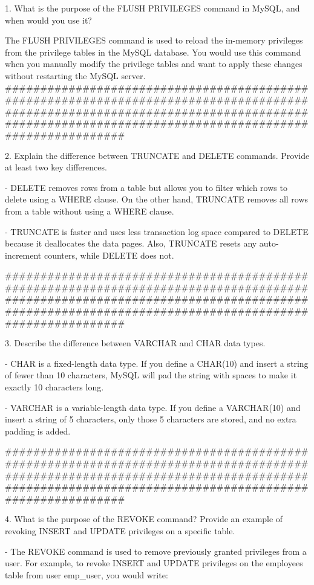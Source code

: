 
1. What is the purpose of the FLUSH PRIVILEGES command in MySQL, and when would you use it?

The FLUSH PRIVILEGES command is used to reload the in-memory privileges from the privilege tables in the MySQL database.
You would use this command when you manually modify the privilege tables and want to apply these changes without restarting the MySQL server.
#############################################################################################################################################################################################

2. Explain the difference between TRUNCATE and DELETE commands. Provide at least two key differences.

- DELETE removes rows from a table but allows you to filter which rows to delete using a WHERE clause. 
  On the other hand, TRUNCATE removes all rows from a table without using a WHERE clause.

- TRUNCATE is faster and uses less transaction log space compared to DELETE because it deallocates the data pages. 
  Also, TRUNCATE resets any auto-increment counters, while DELETE does not.

#############################################################################################################################################################################################

3. Describe the difference between VARCHAR and CHAR data types.

- CHAR is a fixed-length data type. If you define a CHAR(10) and insert a string of fewer than 10 characters, MySQL will pad the string with spaces to make it exactly 10 characters long.

- VARCHAR is a variable-length data type. If you define a VARCHAR(10) and insert a string of 5 characters, only those 5 characters are stored, and no extra padding is added.

#############################################################################################################################################################################################

4. What is the purpose of the REVOKE command? Provide an example of revoking INSERT and UPDATE privileges on a specific table.

- The REVOKE command is used to remove previously granted privileges from a user. 
  For example, to revoke INSERT and UPDATE privileges on the employees table from user emp_user, you would write:

